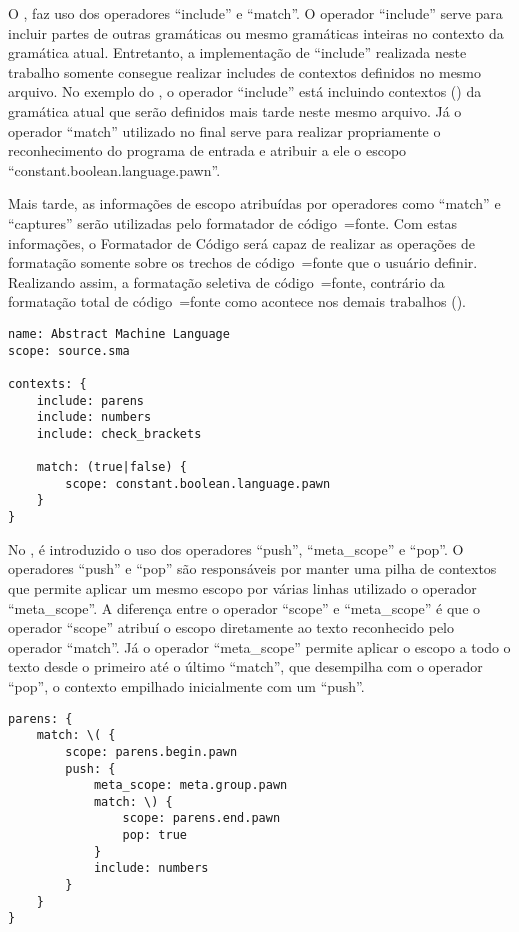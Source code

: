 O ,
faz uso dos operadores ``include'' e
``match''.
O operador ``include'' serve para incluir partes de outras gramáticas ou
mesmo gramáticas inteiras no contexto da gramática atual.
Entretanto,
a implementação de ``include'' realizada neste trabalho somente consegue realizar includes de contextos definidos no mesmo arquivo.
No exemplo do ,
o operador ``include'' está incluindo contextos () da gramática atual que serão definidos mais tarde neste mesmo arquivo.
Já o operador ``match'' utilizado no final serve para realizar propriamente o reconhecimento do programa de entrada e
atribuir a ele o escopo ``constant.boolean.language.pawn''.

Mais tarde,
as informações de escopo atribuídas por operadores como ``match'' e
``captures'' serão utilizadas pelo formatador de código~=fonte.
Com estas informações,
o Formatador de Código será capaz de realizar as operações de formatação somente sobre os trechos de código~=fonte que o usuário definir.
Realizando assim,
a formatação seletiva de código~=fonte,
contrário da formatação total de código~=fonte como acontece nos demais trabalhos ().
\begin{lstlisting}[caption={Exemplo de Gramática, Símbolo Inicial},label={exemploDeGramaticaPawn1},style=yaml_style]
name: Abstract Machine Language
scope: source.sma

contexts: {
    include: parens
    include: numbers
    include: check_brackets

    match: (true|false) {
        scope: constant.boolean.language.pawn
    }
}
\end{lstlisting}

No ,
é introduzido o uso dos operadores ``push'',
``meta\_scope'' e
``pop''.
O operadores ``push'' e
``pop'' são responsáveis por manter uma pilha de contextos que permite aplicar um mesmo escopo por várias linhas utilizado o operador ``meta\_scope''.
A diferença entre o operador ``scope'' e
``meta\_scope'' é que o operador ``scope'' atribuí o escopo diretamente ao texto reconhecido pelo operador ``match''.
Já o operador ``meta\_scope'' permite aplicar o escopo a todo o texto desde o primeiro até o último ``match'',
que desempilha com o operador ``pop'',
o contexto empilhado inicialmente com um ``push''.
\begin{lstlisting}[caption={Exemplo de Gramática, Contextos},label={exemploDeGramaticaPawn2},style=yaml_style]
parens: {
    match: \( {
        scope: parens.begin.pawn
        push: {
            meta_scope: meta.group.pawn
            match: \) {
                scope: parens.end.pawn
                pop: true
            }
            include: numbers
        }
    }
}
\end{lstlisting}


